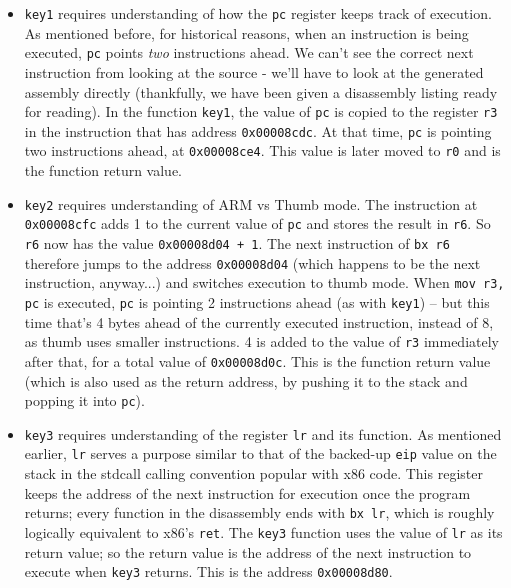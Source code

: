 \documentclass{article}
\newcommand{\xcode}[2]{\colorbox{ubuntuback}{\lstinline[language=#1]|#2|}}
\newcommand{\asm}[1]{\xcode{{[x86masm]assembler}}{#1}}
\newcommand{\code}[1]{\colorbox{ubuntuback}{\texttt{#1}}}
\newcommand{\arm}[1]{\code{#1}}
\begin{document}
\begin{itemize}
    \item \code{key1} requires understanding of how the \arm{pc} register keeps track of execution. As mentioned before, for historical reasons, when an instruction is being executed, \arm{pc} points \textit{two} instructions ahead. We can't see the correct next instruction from looking at the source - we'll have to look at the generated assembly directly (thankfully, we have been given a disassembly listing ready for reading). In the function \code{key1}, the value of \arm{pc} is copied to the register \arm{r3} in the instruction that has address \code{0x00008cdc}. At that time, \arm{pc} is pointing two instructions ahead, at \code{0x00008ce4}. This value is later moved to \arm{r0} and is the function return value.

    \item \code{key2} requires understanding of ARM vs Thumb mode. The instruction at \code{0x00008cfc} adds 1 to the current value of \arm{pc} and stores the result in \arm{r6}. So \arm{r6} now has the value \code{0x00008d04 + 1}. The next instruction of \arm{bx r6} therefore jumps to the address \code{0x00008d04} (which happens to be the next instruction, anyway...) and switches execution to thumb mode. When \arm{mov r3, pc} is executed, \arm{pc} is pointing 2 instructions ahead (as with \code{key1}) -- but this time that's 4 bytes ahead of the currently executed instruction, instead of 8, as thumb uses smaller instructions. 4 is added to the value of \arm{r3} immediately after that, for a total value of \code{0x00008d0c}. This is the function return value (which is also used as the return address, by pushing it to the stack and popping it into \arm{pc}).

    \item \code{key3} requires understanding of the register \arm{lr} and its function. As mentioned earlier, \arm{lr} serves a purpose similar to that of the backed-up \asm{eip} value on the stack in the stdcall calling convention popular with x86 code. This register keeps the address of the next instruction for execution once the program returns; every function in the disassembly ends with \arm{bx lr}, which is roughly logically equivalent to x86's \asm{ret}. The \code{key3} function uses the value of \arm{lr} as its return value; so the return value is the address of the next instruction to execute when \code{key3} returns. This is the address \code{0x00008d80}.
\end{itemize}
\end{document}

